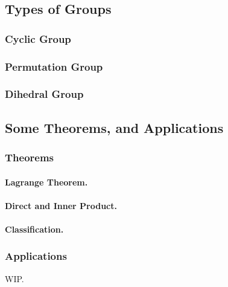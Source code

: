 \clearpage
\subsection{Types of Groups}

\subsubsection{Cyclic Group}

\subsubsection{Permutation Group}

\subsubsection{Dihedral Group}
\subsection{Some Theorems, and Applications}
\subsubsection{Theorems}
\paragraph{Lagrange Theorem.}
\paragraph{Direct and Inner Product.}
\paragraph{Classification.}

\subsubsection{Applications}
WIP.